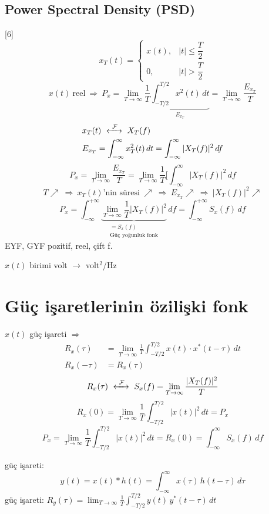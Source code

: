 \documentclass[11pt,a4paper]{article}
\begin{document}
\subsection{Power Spectral Density (PSD)}
[6]
\[
  x_T(t)=\begin{cases} x(t), & |t|\le \dfrac{T}{2} \\[2mm] 0, & |t|>\dfrac{T}{2} \end{cases}
\]
\[
  x(t)\ \text{reel}\ \Rightarrow\ P_x=\lim_{T\to\infty}\frac{1}{T}\underbrace{\int_{-T/2}^{T/2}x^2(t)\,dt}_{E_{x_T}}=\lim_{T\to\infty}\frac{E_{x_T}}{T}
\]
\begin{align*}
  & x_T(t)\ \xleftrightarrow{\ \mathcal{F}\ }\ X_T(f) \\
  & E_{x_T}=\int_{-\infty}^{\infty}x_T^2(t)\,dt=\int_{-\infty}^{\infty}|X_T(f)|^2\,df
\end{align*}
\[
  P_x=\lim_{T\to\infty}\frac{E_{x_T}}{T}=\lim_{T\to\infty}\frac{1}{T}\Big[\int_{-\infty}^{\infty}|X_T(f)|^2\,df
\]
\[
  T\nearrow\ \Rightarrow\ x_T(t)\text{'nin süresi}\ \nearrow\ \Rightarrow\ E_{x_T}\nearrow\ \Rightarrow\ |X_T(f)|^2\nearrow
\]
\[
  P_x=\int_{-\infty}^{+\infty}\underbrace{\lim_{T\to\infty}\frac{1}{T}|X_T(f)|^2}_{\substack{=S_x(f)\\ \text{Güç yoğunluk fonk}}}\,df=\int_{-\infty}^{+\infty}S_x(f)\,df
\]
EYF, GYF pozitif, reel, çift f.

$x(t)$ birimi volt $\rightarrow$ volt$^2$/Hz

\section{Güç işaretlerinin özilişki fonk}
$x(t)$ güç işareti $\Rightarrow$
\begin{align*}
  R_x(\tau) &= \lim_{T\to\infty}\frac{1}{T}\int_{-T/2}^{T/2}x(t)\cdot x^*(t-\tau)\,dt \\
  R_x(-\tau) &= R_x(\tau)
\end{align*}
\[
  R_x(\tau)\ \xleftrightarrow{\ \mathcal{F}\ }\ S_x(f)=\lim_{T\to\infty}\frac{|X_T(f)|^2}{T}
\]
\[
  R_x(0)=\lim_{T\to\infty}\frac{1}{T}\int_{-T/2}^{T/2}|x(t)|^2\,dt=P_x
\]
\[
  P_x=\lim_{T\to\infty}\frac{1}{T}\int_{-T/2}^{T/2}|x(t)|^2\,dt=R_x(0)=\int_{-\infty}^{\infty}S_x(f)\,df
\]
\begin{center}
\end{center}
güç işareti:
\[
  y(t)=x(t)\ast h(t)=\int_{-\infty}^{\infty}x(\tau)\,h(t-\tau)\,d\tau
\]
güç işareti: \quad $R_y(\tau)=\displaystyle\lim_{T\to\infty}\frac{1}{T}\int_{-T/2}^{T/2}y(t)\,y^*(t-\tau)\,dt$
\end{document}
